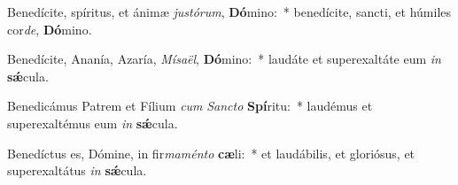 \item Benedícite, spíritus, et ánimæ \textit{jus}\textit{tó}\textit{rum}, \textbf{Dó}mino:~* benedícite, sancti, et húmiles cor\textit{de}, \textbf{Dó}mino.
\item Benedícite, Ananía, Azaría, \textit{Mí}\textit{sa}\textit{ël}, \textbf{Dó}mino:~* laudáte et superexaltáte eum \textit{in} \textbf{sǽ}cula.
\item Benedicámus Patrem et Fílium \textit{cum} \textit{Sanc}\textit{to} \textbf{Spí}ritu:~* laudémus et superexaltémus eum \textit{in} \textbf{sǽ}cula.
\item Benedíctus es, Dómine, in fir\textit{ma}\textit{mén}\textit{to} \textbf{cæ}li:~* et laudábilis, et gloriósus, et superexaltátus \textit{in} \textbf{sǽ}cula.
